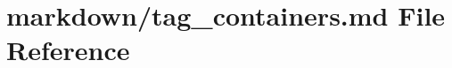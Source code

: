 \hypertarget{tag__containers_8md}{}\section{markdown/tag\+\_\+containers.md File Reference}
\label{tag__containers_8md}
